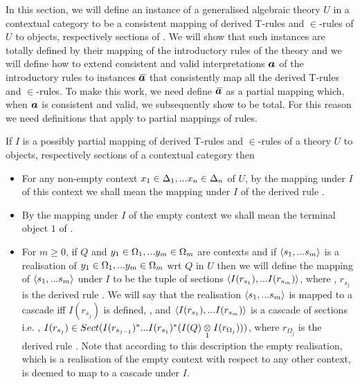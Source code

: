 
\newcommand{\clause}[1]{clause (#1) of definition \lref{consistentinterpretation}}
\newcommand{\condition}[2]{condition (#2) of \clause{#1}}

In this section, we will define an instance of a generalised algebraic theory $U$ in a contextual category \catcw to be a consistent mapping 
of derived T-rules and $\in$-rules of  $U$ to objects, respectively sections of \catc. 
We will show that such instances are totally defined by their mapping of the introductory rules of the theory and we will define how to extend 
consistent and valid interpretations $\iI$ of the introductory rules   to instances $\Ibar$ that consistently map all the derived  T-rules and $\in$-rules.
To make this work, we need define $\Ibar$ as a partial mapping which, when $\iI$ is consistent and valid, we subsequently show to be total. For this reason we need definitions that apply to partial mappings of rules.

If $I$ is a  possibly partial mapping of derived T-rules and $\in$-rules of a theory $U$ to objects, respectively sections of a contextual category \catcw then
\begin{itemize}
\item
For any non-empty context $\xDelta{n}$ of $U$, by the mapping under $I$ of this context we shall mean the mapping under $I$ of the derived rule
.  
\item
By the mapping under $I$ of the empty context we shall mean the terminal object $1$ of \catc.
\item
For $m \geq 0$, if  $Q$ and $\yOmega{m}$ are contexts and if $\tuple{\sm}$ is a realisation of $\yOmega{m}$ wrt $Q$ in $U$
then we will define the mapping of  $\tuple{\sm}$ under $I$ to be the tuple of sections
$\tuple{I(r_{s_1}),...I(r_{s_m})}$, 
where \foreachj, $r_{s_j}$ is the derived rule .
We will say that the realisation $\tuple{\sm}$ is mapped to a cascade iff
 $I(r_{s_j})$ is defined, \foreachj, and 
 $\tuple{I(r_{s_1}),...I(r_{s_m})}$ is a cascade of sections i.e. \foreachj, 
 $I(r_{s_j}) \in Sect(I(r_{s_{j-1}})^*...I(r_{s_1})^*(\crossx{I(Q)}{I(r_{\Omega_j})}{1}))$,
where $r_{\Omega_j}$ is the derived rule . Note that according to this description the empty realisation, which is a realisation of the empty context with respect to any other context, is deemed to map to a cascade under $I$.  
\end{itemize}

\newcommand{\smMappedToCacscade}{
for all contexts $Q$ and for all realisations $\tuple{\sm}$ of $\yOmega{m}$ wrt $Q$ 
which map to a cascade under $I$ ,}
\newcommand{\sjpconclusion}{\ofT{s'_j}{\Omega'_j[s_1|y_1,...s_{j-1}|y_{j-1}]}}
\newcommand{\IfIpartialmappingUtoC}{If $U$ is a generalised algebraic theory and \catcw is a contextual category 
and if $I$ is a partial mapping of derived T-rules and $\in$-rules of the theory $U$ to objects, respectively sections of the contextual category \catc}
\newcommand{\IfIpartialmappingUtoCw}{\IfIpartialmappingUtoC\ }

